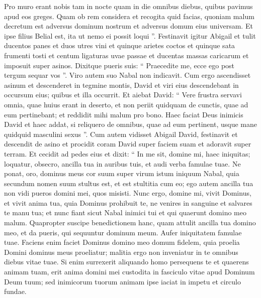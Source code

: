 \begin{biblechapter}
\begin{biblechapter}
\begin{biblechapter}
\begin{biblechapter}
\begin{biblechapter}
\begin{biblechapter}
\begin{biblechapter}
\begin{biblechapter}
\begin{biblechapter}
\begin{biblechapter}
\begin{biblechapter}
\begin{biblechapter}
\begin{biblechapter}
\begin{biblechapter}
\begin{biblechapter}
\begin{biblechapter}
\begin{biblechapter}
\begin{biblechapter}
\begin{biblechapter}
\begin{biblechapter}
\begin{biblechapter}
\begin{biblechapter}
\begin{biblechapter}
\begin{biblechapter}
\begin{biblechapter}
\verse Pro muro erant nobis tam in nocte quam in die omnibus diebus, quibus pavimus apud eos greges. 
\verse Quam ob rem considera et recogita quid facias, quoniam malum decretum est adversus dominum nostrum et adversus domum eius universam. Et ipse filius Belial est, ita ut nemo ei possit loqui ”.
 \verse Festinavit igitur Abigail et tulit ducentos panes et duos utres vini et quinque arietes coctos et quinque sata frumenti tosti et centum ligaturas uvae passae et ducentas massas caricarum et imposuit super asinos. 
\verse Dixitque pueris suis: “ Praecedite me, ecce ego post tergum sequar vos ”. Viro autem suo Nabal non indicavit. 
\verse Cum ergo ascendisset asinum et descenderet in tegmine montis, David et viri eius descendebant in occursum eius; quibus et illa occurrit. 
\verse Et aiebat David: “ Vere frustra servavi omnia, quae huius erant in deserto, et non periit quidquam de cunctis, quae ad eum pertinebant; et reddidit mihi malum pro bono. 
\verse Haec faciat Deus inimicis David et haec addat, si reliquero de omnibus, quae ad eum pertinent, usque mane quidquid masculini sexus ”.
 \verse Cum autem vidisset Abigail David, festinavit et descendit de asino et procidit coram David super faciem suam et adoravit super terram. 
\verse Et cecidit ad pedes eius et dixit: “ In me sit, domine mi, haec iniquitas; loquatur, obsecro, ancilla tua in auribus tuis, et audi verba famulae tuae. 
 \verse Ne ponat, oro, dominus meus cor suum super virum istum iniquum Nabal, quia secundum nomen suum stultus est, et est stultitia cum eo; ego autem ancilla tua non vidi pueros domini mei, quos misisti. 
\verse Nunc ergo, domine mi, vivit Dominus, et vivit anima tua, quia Dominus prohibuit te, ne venires in sanguine et salvares te manu tua; et nunc fiant sicut Nabal inimici tui et qui quaerunt domino meo malum. 
\verse Quapropter suscipe benedictionem hanc, quam attulit ancilla tua domino meo, et da pueris, qui sequuntur dominum meum. 
\verse Aufer iniquitatem famulae tuae. Faciens enim faciet Dominus domino meo domum fidelem, quia proelia Domini dominus meus proeliatur; malitia ergo non inveniatur in te omnibus diebus vitae tuae. 
\verse Si enim surrexerit aliquando homo persequens te et quaerens animam tuam, erit anima domini mei custodita in fasciculo vitae apud Dominum Deum tuum; sed inimicorum tuorum animam ipse iaciat in impetu et circulo fundae. 

\end{biblechapter}
\end{biblechapter}
\end{biblechapter}
\end{biblechapter}
\end{biblechapter}
\end{biblechapter}
\end{biblechapter}
\end{biblechapter}
\end{biblechapter}
\end{biblechapter}
\end{biblechapter}
\end{biblechapter}
\end{biblechapter}
\end{biblechapter}
\end{biblechapter}
\end{biblechapter}
\end{biblechapter}
\end{biblechapter}
\end{biblechapter}
\end{biblechapter}
\end{biblechapter}
\end{biblechapter}
\end{biblechapter}
\end{biblechapter}
\end{biblechapter}
